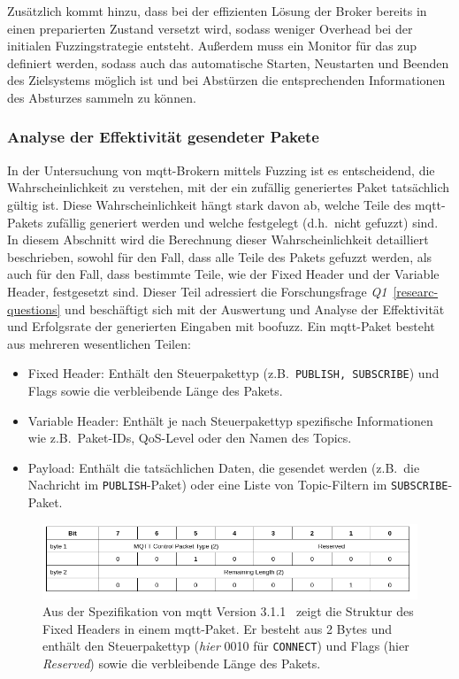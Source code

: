 Zusätzlich kommt hinzu, dass bei der effizienten Lösung der Broker bereits in einen preparierten Zustand versetzt wird,
sodass weniger Overhead bei der initialen Fuzzingstrategie entsteht.
Außerdem muss ein Monitor für das \gls{zup} definiert werden, sodass auch das automatische Starten, Neustarten und Beenden
des Zielsystems möglich ist und bei Abstürzen die entsprechenden Informationen des Absturzes sammeln zu können.
\subsubsection{Analyse der Effektivität gesendeter Pakete}
In der Untersuchung von \gls{mqtt}-Brokern mittels Fuzzing ist es entscheidend, die Wahrscheinlichkeit zu verstehen, mit der
ein zufällig generiertes Paket tatsächlich gültig ist.
Diese Wahrscheinlichkeit hängt stark davon ab, welche Teile des \gls{mqtt}-Pakets zufällig generiert werden und welche festgelegt
(d.h.\ nicht gefuzzt) sind.
In diesem Abschnitt wird die Berechnung dieser Wahrscheinlichkeit detailliert beschrieben, sowohl für den Fall, dass alle
Teile des Pakets gefuzzt werden, als auch für den Fall, dass bestimmte Teile, wie der Fixed Header und der Variable Header,
festgesetzt sind.
Dieser Teil adressiert die Forschungsfrage \textit{Q1}~\ref{researc-questions} und beschäftigt sich mit der Auswertung
und Analyse der Effektivität und Erfolgsrate der generierten Eingaben mit boofuzz.\newline\newline
\noindent Ein \gls{mqtt}-Paket besteht aus mehreren wesentlichen Teilen:
\begin{itemize}
    \item Fixed Header: Enthält den Steuerpakettyp (z.B.\ \texttt{PUBLISH, SUBSCRIBE}) und Flags sowie die verbleibende Länge des Pakets.
    \item Variable Header: Enthält je nach Steuerpakettyp spezifische Informationen wie z.B.\ Paket-IDs, QoS-Level oder den Namen des Topics.
    \item Payload: Enthält die tatsächlichen Daten, die gesendet werden (z.B.\ die Nachricht im \texttt{PUBLISH}-Paket)
    oder eine Liste von Topic-Filtern im \texttt{SUBSCRIBE}-Paket.
\end{itemize}
\begin{figure}[H]
    \centering
    \includegraphics[width=\textwidth]{img/fixed_header_structure}
    \caption[Struktur des Fixed Headers in einem \gls{mqtt}-Paket]{Aus der Spezifikation von \gls{mqtt} Version 3.1.1~\cite{mqtt}
        zeigt die Struktur des Fixed Headers in einem \gls{mqtt}-Paket.
        Er besteht aus 2 Bytes und enthält den Steuerpakettyp (\textit{hier} 0010 für \texttt{CONNECT}) und Flags (hier \textit{Reserved})
        sowie die verbleibende Länge des Pakets.}
    \label{fig:fixed_header_structure}
\end{figure}
